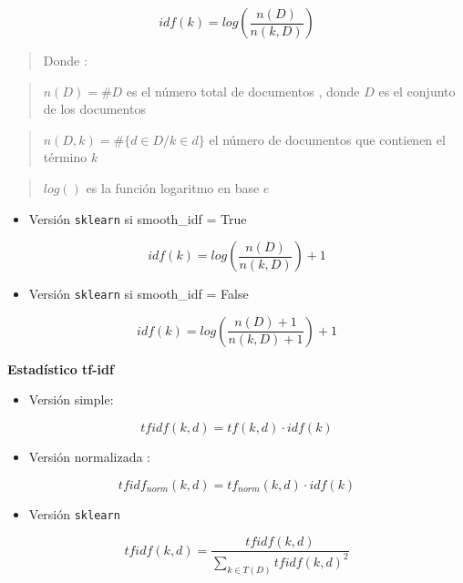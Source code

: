 \documentclass[
  11pt,
  a4paper,
]{article}
\providecommand{\tightlist}{%
  \setlength{\itemsep}{0pt}\setlength{\parskip}{0pt}}
\begin{document}
\[idf (k)=log\left(\dfrac{n(D)}{n(k, D)}\right)\]

\begin{quote}
Donde :
\end{quote}

\begin{quote}
\(n(D)= \# D\) es el número total de documentos , donde \(D\) es el
conjunto de los documentos
\end{quote}

\begin{quote}
\(n(D, k)=\# \lbrace d\in D / k \in d \rbrace\) el número de documentos
que contienen el término \(k\)
\end{quote}

\begin{quote}
\(log()\) es la función logaritmo en base \(e\)
\end{quote}

\begin{itemize}
\tightlist
\item
  Versión \texttt{sklearn} si smooth\_idf = True
\end{itemize}

\[idf (k)=log\left(\dfrac{n(D)}{n(k, D)}\right) + 1\]

\begin{itemize}
\tightlist
\item
  Versión \texttt{sklearn} si smooth\_idf = False
\end{itemize}

\[idf (k)=log\left(\dfrac{n(D) + 1}{n(k, D) + 1}\right) + 1\]

\textbf{Estadístico tf-idf}

\begin{itemize}
\tightlist
\item
  Versión simple:
\end{itemize}

\[tfidf(k, d)=tf(k, d) \cdot idf (k)\]

\begin{itemize}
\tightlist
\item
  Versión normalizada :
\end{itemize}

\[tfidf_{norm}(k, d) = tf_{norm}(k, d) \cdot idf (k)\]

\begin{itemize}
\tightlist
\item
  Versión \texttt{sklearn}
\end{itemize}

\[tfidf(k, d) = \dfrac{tfidf(k, d)}{ \sum_{k\in T(D)} tfidf(k, d)^2 }\]
\end{document}
